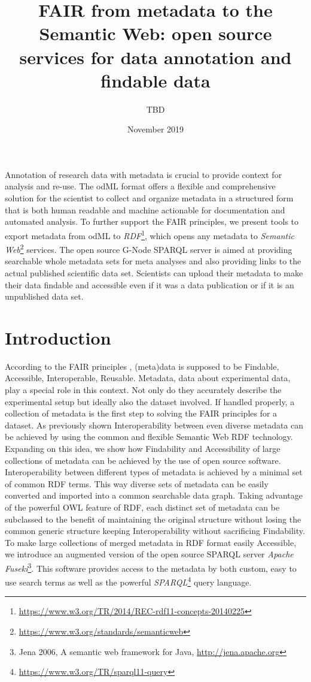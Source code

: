 \documentclass{article}
\title{FAIR from metadata to the Semantic Web: open source services for data annotation and findable data}
\author{TBD}
\date{November 2019}
\begin{document}
\maketitle

\begin{Abstract}
Annotation of research data with metadata is crucial to provide context for analysis and  re-use. The odML format offers a flexible and comprehensive solution for the scientist to collect and organize metadata in a structured form that is both human readable and machine actionable for documentation and automated analysis. To further support the FAIR principles, we present tools to export metadata from odML to \textit{RDF}\footnote{\url{https://www.w3.org/TR/2014/REC-rdf11-concepts-20140225}}, which opens any metadata to \textit{Semantic Web}\footnote{\url{https://www.w3.org/standards/semanticweb}} services. The open source G-Node SPARQL server is aimed at providing searchable whole metadata sets for meta analyses and also providing links to the actual published scientific data set. Scientists can upload their metadata to make their data findable and accessible even if it was a data publication or if it is an unpublished data set.
\end{Abstract}

\section{Introduction}
According to the FAIR principles \cite{Wilkinson_2016}, (meta)data is supposed to be Findable, Accessible, Interoperable, Reusable. Metadata, data about experimental data, play a special role in this context. Not only do they accurately describe the experimental setup but ideally also the dataset involved. If handled properly, a collection of metadata is the first step to solving the FAIR principles for a dataset. As previously shown \cite{Teeters_2017} Interoperability  between even diverse metadata can be achieved by using the common and flexible Semantic Web RDF technology.
Expanding on this idea, we show how Findability and Accessibility of large collections of metadata can be achieved by the use of open source software. Interoperability between different types of metadata is achieved by a minimal set of common RDF terms. This way diverse sets of metadata can be easily converted and imported into a common searchable data graph. Taking advantage of the powerful OWL feature of RDF, each distinct set of metadata can be subclassed to the benefit of maintaining the original structure without losing the common generic structure keeping Interoperability without sacrificing Findability.
To make large collections of merged metadata in RDF format easily Accessible, we introduce an augmented version of the open source SPARQL server \textit{Apache Fuseki}\footnote{Jena 2006, A semantic web framework for Java, \url{http://jena.apache.org}}. This software provides access to the metadata by both custom, easy to use search terms as well as the powerful \textit{SPARQL}\footnote{\url{https://www.w3.org/TR/sparql11-query}} query language.
\end{document}
